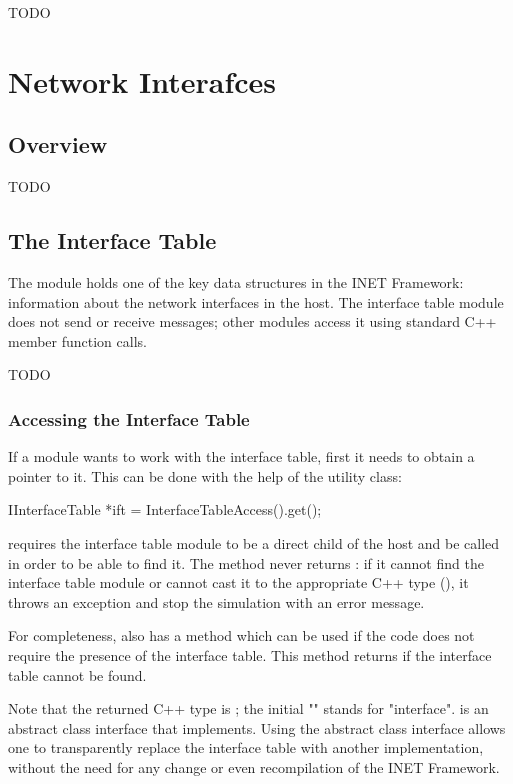\ifdraft TODO

\chapter{Network Interafces}
\label{cha:network-interfaces}

\section{Overview}

TODO

\section{The Interface Table}

The  module holds one of the key data structures in
the INET Framework: information about the network interfaces in the host.
The interface table module does not send or receive messages; other modules
access it using standard C++ member function calls.

 TODO
\subsection{Accessing the Interface Table}

If a module wants to work with the interface table, first it needs to obtain a
pointer to it. This can be done with the help of the
 utility class:

\begin{cpp}
IInterfaceTable *ift = InterfaceTableAccess().get();
\end{cpp}

 requires the interface table module to be a
direct child of the host and be called  in order to
be able to find it. The  method never returns : if
it cannot find the interface table module or cannot cast it to the
appropriate C++ type (), it throws an exception
and stop the simulation with an error message.

For completeness,  also has a
 method which can be used if the code does not require
the presence of the interface table. This method returns  if the
interface table cannot be found.

Note that the returned C++ type is ; the initial
"" stands for "interface".  is an abstract
class interface that  implements. Using the abstract
class interface allows one to transparently replace the interface table with
another implementation, without the need for any change or even
recompilation of the INET Framework.


